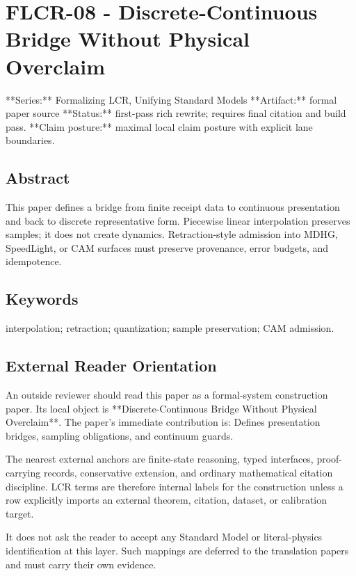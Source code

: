 \documentclass[11pt]{article}
\begin{document}
\section*{FLCR-08 - Discrete-Continuous Bridge Without Physical Overclaim}

**Series:** Formalizing LCR, Unifying Standard Models
**Artifact:** formal paper source
**Status:** first-pass rich rewrite; requires final citation and build pass.
**Claim posture:** maximal local claim posture with explicit lane boundaries.

\subsection*{Abstract}

This paper defines a bridge from finite receipt data to continuous presentation and back to discrete representative form. Piecewise linear interpolation preserves samples; it does not create dynamics. Retraction-style admission into MDHG, SpeedLight, or CAM surfaces must preserve provenance, error budgets, and idempotence.

\subsection*{Keywords}

interpolation; retraction; quantization; sample preservation; CAM admission.

\subsection*{External Reader Orientation}

An outside reviewer should read this paper as a formal-system construction paper. Its local object is **Discrete-Continuous Bridge Without Physical Overclaim**. The paper's immediate contribution is: Defines presentation bridges, sampling obligations, and continuum guards.

The nearest external anchors are finite-state reasoning, typed interfaces, proof-carrying records, conservative extension, and ordinary mathematical citation discipline. LCR terms are therefore internal labels for the construction unless a row explicitly imports an external theorem, citation, dataset, or calibration target.

It does not ask the reader to accept any Standard Model or literal-physics identification at this layer. Such mappings are deferred to the translation papers and must carry their own evidence.
\end{document}
